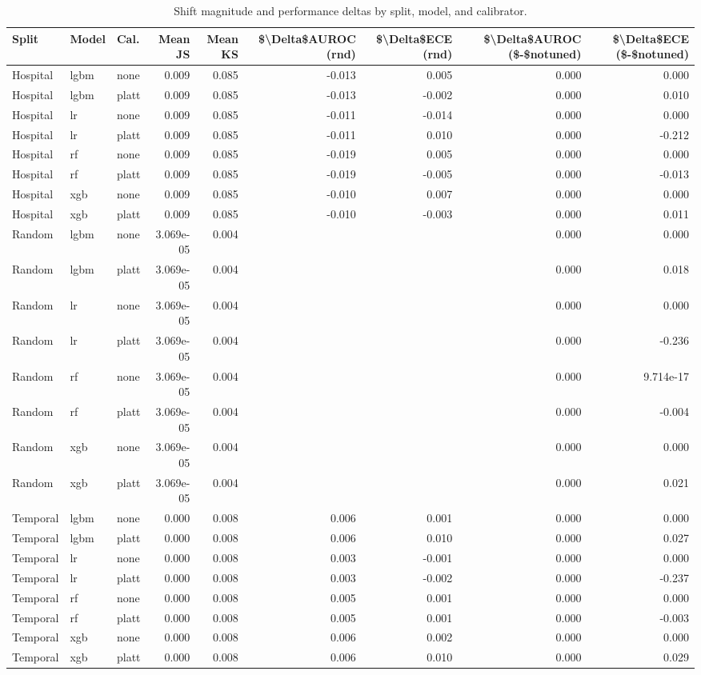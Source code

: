\begin{table}
\caption{Shift magnitude and performance deltas by split, model, and calibrator.}
\label{tab:perf-link}
\begin{tabular}{lllrrrrrr}
\toprule
Split & Model & Cal. & Mean JS & Mean KS & \$\textbackslash Delta\$AUROC (rnd) & \$\textbackslash Delta\$ECE (rnd) & \$\textbackslash Delta\$AUROC (\$-\$notuned) & \$\textbackslash Delta\$ECE (\$-\$notuned) \\
\midrule
Hospital & lgbm & none & 0.009 & 0.085 & -0.013 & 0.005 & 0.000 & 0.000 \\
Hospital & lgbm & platt & 0.009 & 0.085 & -0.013 & -0.002 & 0.000 & 0.010 \\
Hospital & lr & none & 0.009 & 0.085 & -0.011 & -0.014 & 0.000 & 0.000 \\
Hospital & lr & platt & 0.009 & 0.085 & -0.011 & 0.010 & 0.000 & -0.212 \\
Hospital & rf & none & 0.009 & 0.085 & -0.019 & 0.005 & 0.000 & 0.000 \\
Hospital & rf & platt & 0.009 & 0.085 & -0.019 & -0.005 & 0.000 & -0.013 \\
Hospital & xgb & none & 0.009 & 0.085 & -0.010 & 0.007 & 0.000 & 0.000 \\
Hospital & xgb & platt & 0.009 & 0.085 & -0.010 & -0.003 & 0.000 & 0.011 \\
Random & lgbm & none & 3.069e-05 & 0.004 &  &  & 0.000 & 0.000 \\
Random & lgbm & platt & 3.069e-05 & 0.004 &  &  & 0.000 & 0.018 \\
Random & lr & none & 3.069e-05 & 0.004 &  &  & 0.000 & 0.000 \\
Random & lr & platt & 3.069e-05 & 0.004 &  &  & 0.000 & -0.236 \\
Random & rf & none & 3.069e-05 & 0.004 &  &  & 0.000 & 9.714e-17 \\
Random & rf & platt & 3.069e-05 & 0.004 &  &  & 0.000 & -0.004 \\
Random & xgb & none & 3.069e-05 & 0.004 &  &  & 0.000 & 0.000 \\
Random & xgb & platt & 3.069e-05 & 0.004 &  &  & 0.000 & 0.021 \\
Temporal & lgbm & none & 0.000 & 0.008 & 0.006 & 0.001 & 0.000 & 0.000 \\
Temporal & lgbm & platt & 0.000 & 0.008 & 0.006 & 0.010 & 0.000 & 0.027 \\
Temporal & lr & none & 0.000 & 0.008 & 0.003 & -0.001 & 0.000 & 0.000 \\
Temporal & lr & platt & 0.000 & 0.008 & 0.003 & -0.002 & 0.000 & -0.237 \\
Temporal & rf & none & 0.000 & 0.008 & 0.005 & 0.001 & 0.000 & 0.000 \\
Temporal & rf & platt & 0.000 & 0.008 & 0.005 & 0.001 & 0.000 & -0.003 \\
Temporal & xgb & none & 0.000 & 0.008 & 0.006 & 0.002 & 0.000 & 0.000 \\
Temporal & xgb & platt & 0.000 & 0.008 & 0.006 & 0.010 & 0.000 & 0.029 \\
\bottomrule
\end{tabular}
\end{table}
